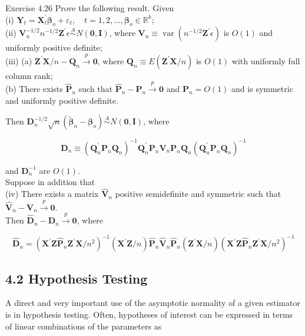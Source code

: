 \documentclass[10pt]{article}
\begin{document}
Exercise 4.26 Prove the following result. Given\\
(i) $\mathbf{Y}_{t}=\mathbf{X}_{t}^{\prime} \boldsymbol{\beta}_{o}+\varepsilon_{t}, \quad t=1,2, \ldots, \boldsymbol{\beta}_{o} \in \mathbb{R}^{k}$;\\
(ii) $\mathbf{V}_{n}^{-1 / 2} n^{-1 / 2} \mathbf{Z}^{\prime} \epsilon \stackrel{A}{\sim} N(\mathbf{0}, \mathbf{I})$, where $\mathbf{V}_{n} \equiv \operatorname{var}\left(n^{-1 / 2} \mathbf{Z}^{\prime} \epsilon\right)$ is $O(1)$ and uniformly positive definite;\\
(iii) (a) $\mathbf{Z}^{\prime} \mathbf{X} / n-\mathbf{Q}_{n} \xrightarrow{p} \mathbf{0}$, where $\mathbf{Q}_{n} \equiv E\left(\mathbf{Z}^{\prime} \mathbf{X} / n\right)$ is $O(1)$ with uniformly full column rank;\\
(b) There exists $\hat{\mathbf{P}}_{n}$ such that $\hat{\mathbf{P}}_{n}-\mathbf{P}_{n} \xrightarrow{p} \mathbf{0}$ and $\mathbf{P}_{n}=O(1)$ and is symmetric and uniformly positive definite.

Then $\mathbf{D}_{n}^{-1 / 2} \sqrt{n}\left(\tilde{\boldsymbol{\beta}}_{n}-\boldsymbol{\beta}_{o}\right) \stackrel{A}{\sim} N(\mathbf{0}, \mathbf{I})$, where

$$
\mathbf{D}_{n} \equiv\left(\mathbf{Q}_{n}^{\prime} \mathbf{P}_{n} \mathbf{Q}_{n}\right)^{-1} \mathbf{Q}_{n}^{\prime} \mathbf{P}_{n} \mathbf{V}_{n} \mathbf{P}_{n} \mathbf{Q}_{n}\left(\mathbf{Q}_{n}^{\prime} \mathbf{P}_{n} \mathbf{Q}_{n}\right)^{-1}
$$

and $\mathbf{D}_{n}^{-1}$ are $O(1)$.\\
Suppose in addition that\\
(iv) There exists a matrix $\hat{\mathbf{V}}_{n}$ positive semidefinite and symmetric such that $\hat{\mathbf{V}}_{n}-\mathbf{V}_{n} \xrightarrow{p} \mathbf{0}$.\\
Then $\hat{\mathbf{D}}_{n}-\mathbf{D}_{n} \xrightarrow{p} \mathbf{0}$, where

$$
\hat{\mathbf{D}}_{n}=\left(\mathbf{X}^{\prime} \mathbf{Z} \hat{\mathbf{P}}_{n} \mathbf{Z}^{\prime} \mathbf{X} / n^{2}\right)^{-1}\left(\mathbf{X}^{\prime} \mathbf{Z} / n\right) \hat{\mathbf{P}}_{n} \hat{\mathbf{V}}_{n} \hat{\mathbf{P}}_{n}\left(\mathbf{Z}^{\prime} \mathbf{X} / n\right)\left(\mathbf{X}^{\prime} \mathbf{Z} \hat{\mathbf{P}}_{n} \mathbf{Z}^{\prime} \mathbf{X} / n^{2}\right)^{-1}
$$

\subsection*{4.2 Hypothesis Testing}
A direct and very important use of the asymptotic normality of a given estimator is in hypothesis testing. Often, hypotheses of interest can be expressed in terms of linear combinations of the parameters as
\end{document}

